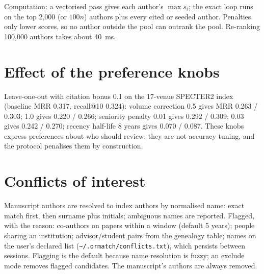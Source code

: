\documentclass[11pt]{article}
\begin{document}
Computation: a vectorised pass gives each author's $\max s_i$; the exact loop runs on the top 2{,}000 (or $100n$) authors plus every cited or seeded author. Penalties only lower scores, so no author outside the pool can outrank the pool. Re-ranking 100{,}000 authors takes about 40~ms.

\section{Effect of the preference knobs}\label{app:knobs}
Leave-one-out with citation bonus 0.1 on the 17-venue SPECTER2 index (baseline MRR 0.317, recall@10 0.324):
volume correction 0.5 gives MRR 0.263 / 0.303; 1.0 gives 0.220 / 0.266; seniority penalty 0.01 gives 0.292 / 0.309; 0.03 gives 0.242 / 0.270; recency half-life 8 years gives 0.070 / 0.087. These knobs express preferences about who should review; they are not accuracy tuning, and the protocol penalises them by construction.

\section{Conflicts of interest}\label{app:coi}
Manuscript authors are resolved to index authors by normalised name: exact match first, then surname plus initials; ambiguous names are reported. Flagged, with the reason: co-authors on papers within a window (default 5 years); people sharing an institution; advisor/student pairs from the genealogy table; names on the user's declared list (\texttt{\textasciitilde/.ormatch/conflicts.txt}), which persists between sessions. Flagging is the default because name resolution is fuzzy; an exclude mode removes flagged candidates. The manuscript's authors are always removed.
\end{document}
